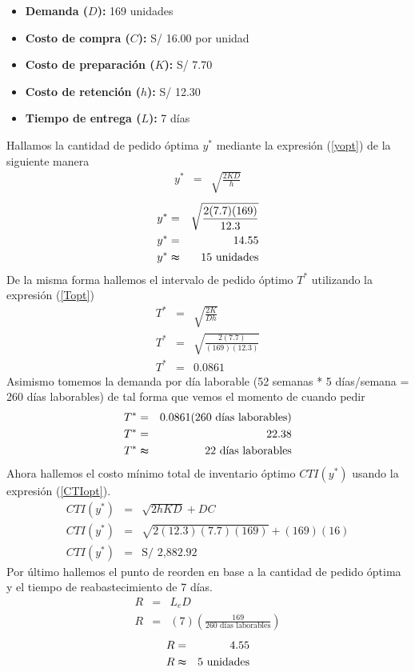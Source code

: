 \begin{itemize}
    \item \textbf{Demanda ($D$):} 169 unidades
    \item \textbf{Costo de compra ($C$):} S/ 16.00 por unidad
    \item \textbf{Costo de preparación ($K$):} S/ 7.70
    \item \textbf{Costo de retención ($h$):} S/ 12.30
    \item \textbf{Tiempo de entrega ($L$):} 7 días
\end{itemize}
Hallamos la cantidad de pedido óptima $y^*$ mediante la expresión (\ref{yopt}) de la siguiente manera
\begin{eqnarray}
    y^* &=& \sqrt{\frac{2KD}{h}} \nonumber
\end{eqnarray}
\begin{eqnarray}
    y^* &=& \sqrt{\frac{2(7.7)(169)}{12.3}} \nonumber \\
    y^* &=& 14.55 \nonumber \\
    y^* &\thickapprox& 15 \text{ unidades} \nonumber
\end{eqnarray}
De la misma forma hallemos el intervalo de pedido óptimo $T^*$ utilizando la expresión (\ref{Topt}) 
\begin{eqnarray}
    T^* &=& \sqrt{\frac{2K}{Dh}} \nonumber \\
    T^* &=& \sqrt{\frac{2(7.7)}{(169)(12.3)}} \nonumber \\
    T^* &=& 0.0861 \nonumber
\end{eqnarray}
Asimismo tomemos la demanda por día laborable (52 semanas * 5 días/semana = 260 días laborables) de tal forma que vemos el momento de cuando pedir
\begin{eqnarray}
    T^* &=& 0.0861 (260 \text{ días laborables}) \nonumber \\   
    T^* &=& 22.38 \nonumber \\
    T^* &\thickapprox& 22 \text{ días laborables} \nonumber
\end{eqnarray}
Ahora hallemos el costo mínimo total de inventario óptimo $CTI(y^*)$ usando la expresión (\ref{CTIopt}).
\begin{eqnarray}
    CTI(y^*) &=& \sqrt{2hKD} + DC \nonumber \\
    CTI(y^*) &=& \sqrt{2(12.3)(7.7)(169)} + (169)(16) \nonumber \\
    CTI(y^*) &=& \text{S/ 2,882.92} \nonumber
\end{eqnarray}
Por último hallemos el punto de reorden en base a la cantidad de pedido óptima y el tiempo de reabastecimiento de 7 días.
\begin{eqnarray}
    R &=& L_e D \nonumber \\
    R &=& (7) \left(\frac{169}{260 \text{ días laborables}} \right) \nonumber
\end{eqnarray}
\begin{eqnarray}
    R &=& 4.55 \nonumber \\
    R &\thickapprox& 5 \text{ unidades} \nonumber
\end{eqnarray}

